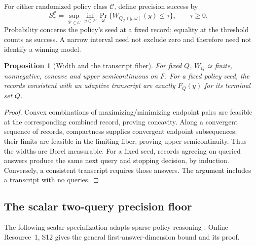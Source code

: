 \documentclass[12pt]{article}
\newtheorem{proposition}{Proposition}
\begin{document}
For either randomized policy class $\mathcal C$, define precision success by
\begin{equation}
 S_\tau^{\mathcal C}
 =\sup_{\mathcal P\in\mathcal C}\inf_{y\in F}
   \Pr_\omega\{W_{Q_{\mathcal P}(y,\omega)}(y)\leq\tau\},
 \qquad \tau\geq0.
 \label{eq:risk_precision_success}
\end{equation}
Probability concerns the policy's seed at a fixed record; equality at the
threshold counts as success. A narrow interval need not exclude zero and
therefore need not identify a winning model.

\begin{proposition}[Width and the transcript fiber]
\label{prop:risk_concavity_transcript}
For fixed $Q$, $W_Q$ is finite, nonnegative, concave and upper
semicontinuous on $F$. For a fixed policy seed, the records consistent
with an adaptive transcript are exactly $F_Q(y)$ for its terminal set $Q$.
\end{proposition}
\begin{proof}
Convex combinations of maximizing/minimizing endpoint pairs are feasible
at the corresponding combined record, proving concavity. Along a
convergent sequence of records, compactness supplies convergent endpoint
subsequences; their limits are feasible in the limiting fiber, proving
upper semicontinuity. Thus the widths are Borel measurable. For a fixed
seed, records agreeing on queried answers produce the same next query
and stopping decision, by induction. Conversely, a consistent transcript
requires those answers. The argument includes a transcript with no queries.
\end{proof}
\subsection{The scalar two-query precision floor}
The following scalar specialization adapts sparse-policy reasoning
\citep[Theorem~2 and Example~5]{kurtz2026}. Online Resource~1, S12 gives
the general first-answer-dimension bound and its proof.
\end{document}
